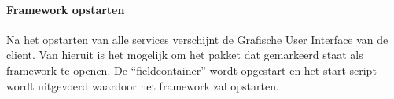 \paragraph{Framework opstarten}
Na het opstarten van alle services verschijnt de Grafische User Interface van de client.
Van hieruit is het mogelijk om het pakket dat gemarkeerd staat als framework te openen.
De ``fieldcontainer'' wordt opgestart en het start script wordt uitgevoerd waardoor het framework zal opstarten.